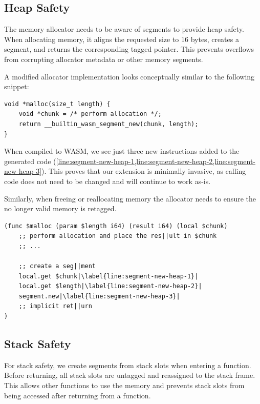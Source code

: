 \subsection{Heap Safety}
\label{subsec:heap-safety}

The memory allocator needs to be aware of segments to provide heap safety.
When allocating memory, it aligns the requested size to 16 bytes, creates a segment, and returns the corresponding tagged pointer.
This prevents overflows from corrupting allocator metadata or other memory segments.

A modified allocator implementation looks conceptually similar to the following snippet:

\begin{lstlisting}[frame=h,style=customc,
    label={lst:heap-allocator-example}]
void *malloc(size_t length) {
    void *chunk = /* perform allocation */;
    return __builtin_wasm_segment_new(chunk, length);
}
\end{lstlisting}

When compiled to \ac{WASM}, we see just three new instructions added to the generated code (\cref{line:segment-new-heap-1,line:segment-new-heap-2,line:segment-new-heap-3}).
This proves that our extension is minimally invasive, as calling code does not need to be changed and will continue to work as-is.

Similarly, when freeing or reallocating memory the allocator needs to ensure the no longer valid memory is retagged.

\begin{lstlisting}[frame=h,style=customwasm,
    label={lst:wasm-allocator-example},escapechar=|]
(func $malloc (param $length i64) (result i64) (local $chunk)
    ;; perform allocation and place the res||ult in $chunk
    ;; ...

    ;; create a seg||ment
    local.get $chunk|\label{line:segment-new-heap-1}|
    local.get $length|\label{line:segment-new-heap-2}|
    segment.new|\label{line:segment-new-heap-3}|
    ;; implicit ret||urn
)
\end{lstlisting}

\subsection{Stack Safety}
\label{subsec:stack-safety}

For stack safety, we create segments from stack slots when entering a function.
Before returning, all stack slots are untagged and reassigned to the stack frame.
This allows other functions to use the memory and prevents stack slots from being accessed after returning from a function.

